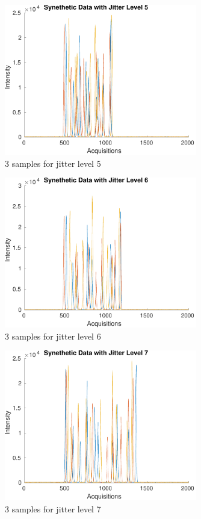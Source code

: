 \documentclass[preprint,12pt]{elsarticle}
\begin{document}
\begin{figure}[h]
    \centering
    \includegraphics[width=0.75\textwidth]{figures/jitter_illustration5.pdf}
    \caption{3 samples for jitter level 5}
    \label{fig:afigure5}
\end{figure}

\begin{figure}[h]
    \centering
    \includegraphics[width=0.75\textwidth]{figures/jitter_illustration6.pdf}
    \caption{3 samples for jitter level 6}
    \label{fig:afigure6}
\end{figure}

\begin{figure}[h]
    \centering
    \includegraphics[width=0.75\textwidth]{figures/jitter_illustration7.pdf}
    \caption{3 samples for jitter level 7}
    \label{fig:afigure7}
\end{figure}
\end{document}
